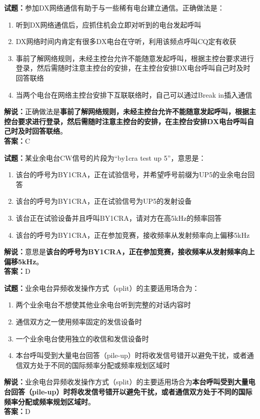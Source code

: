 \documentclass{ctexbook}
\begin{document}
\bigskip




\noindent\textbf{试题：}参加DX网络通信有助于与一些稀有电台建立通信。正确做法是：
\begin{enumerate}[leftmargin=3em]
\item 听到DX网络通信后，应抓住机会立即对听到的电台发起呼叫
\item DX网络时间内肯定有很多DX电台在守听，利用该频点呼叫CQ定有收获
\item 事前了解网络规则，未经主控台允许不能随意发起呼叫，根据主控台要求进行登录，然后需随时注意主控台的安排，在主控台安排DX电台呼叫自己时及时回答联络
\item 当两个电台在网络主控台安排下互联联络时，自己可以通过Break in插入通信
\end{enumerate}
\noindent\textbf{解说：}正确做法是\textbf{事前了解网络规则，未经主控台允许不能随意发起呼叫，根据主控台要求进行登录，然后需随时注意主控台的安排，在主控台安排DX电台呼叫自己时及时回答联络}。\\\noindent\textbf{答案：}C

\bigskip




\noindent\textbf{试题：}某业余电台CW信号的片段为“by1cra test up 5”，意思是：
\begin{enumerate}[leftmargin=3em]
\item 该台的呼号为BY1CRA，正在试验信号，并希望呼号前缀为UP5的业余电台回答
\item 该台的呼号为BY1CRA，正在试验信号为UP5的发射设备
\item 该台正在试验设备并且呼叫BY1CRA，请对方在高5\unit{\kHz}的频率回答
\item 该台的呼号为BY1CRA，正在参加竞赛，接收频率从发射频率向上偏移5\unit{\kHz}
\end{enumerate}
\noindent\textbf{解说：}意思是\textbf{该台的呼号为BY1CRA，正在参加竞赛，接收频率从发射频率向上偏移5\unit{\kHz}}。\\\noindent\textbf{答案：}D

\bigskip




\noindent\textbf{试题：}业余电台异频收发操作方式（split）的主要适用场合为：
\begin{enumerate}[leftmargin=3em]
\item 两个业余电台不想使其他业余电台听到完整的对话内容时
\item 通信双方之一使用频率固定的发信设备时
\item 一个业余电台使用独立的收信和发信设备时
\item 本台呼叫受到大量电台回答（pile-up）时将收发信号错开以避免干扰，或者通信双方处于不同的国际频率分配或频率规划区域时
\end{enumerate}
\noindent\textbf{解说：}业余电台异频收发操作方式（split）的主要适用场合为\textbf{本台呼叫受到大量电台回答（pile-up）时将收发信号错开以避免干扰，或者通信双方处于不同的国际频率分配或频率规划区域时}。\\\noindent\textbf{答案：}D
\end{document}
